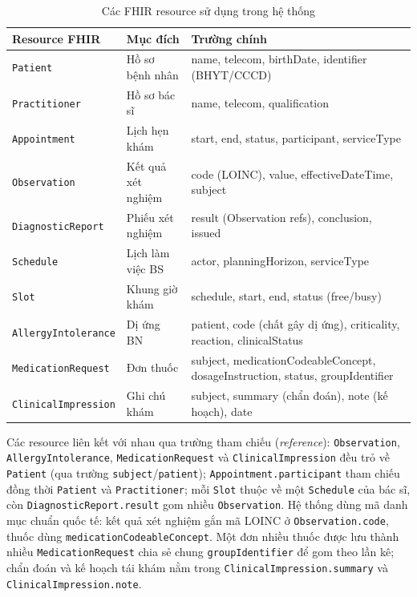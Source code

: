 \documentclass[a4paper,13pt,3p,twoside,openany]{report}
\theoremstyle{definition}
\theoremstyle{remark}
\theoremstyle{definition}
\begin{document}
\begin{table}[H]
\centering
\begin{tabular}{|l|l|p{7cm}|}
\hline
\textbf{Resource FHIR} & \textbf{Mục đích} & \textbf{Trường chính} \\
\hline
\texttt{Patient} & Hồ sơ bệnh nhân & name, telecom, birthDate, identifier (BHYT/CCCD) \\
\hline
\texttt{Practitioner} & Hồ sơ bác sĩ & name, telecom, qualification \\
\hline
\texttt{Appointment} & Lịch hẹn khám & start, end, status, participant, serviceType \\
\hline
\texttt{Observation} & Kết quả xét nghiệm & code (LOINC), value, effectiveDateTime, subject \\
\hline
\texttt{DiagnosticReport} & Phiếu xét nghiệm & result (Observation refs), conclusion, issued \\
\hline
\texttt{Schedule} & Lịch làm việc BS & actor, planningHorizon, serviceType \\
\hline
\texttt{Slot} & Khung giờ khám & schedule, start, end, status (free/busy) \\
\hline
\texttt{AllergyIntolerance} & Dị ứng BN & patient, code (chất gây dị ứng), criticality, reaction, clinicalStatus \\
\hline
\texttt{MedicationRequest} & Đơn thuốc & subject, medicationCodeableConcept, dosageInstruction, status, groupIdentifier \\
\hline
\texttt{ClinicalImpression} & Ghi chú khám & subject, summary (chẩn đoán), note (kế hoạch), date \\
\hline
\end{tabular}
\caption{Các FHIR resource sử dụng trong hệ thống}
\label{tab:fhir-resources}
\end{table}

Các resource liên kết với nhau qua trường tham chiếu (\textit{reference}): \texttt{Observation}, \texttt{AllergyIntolerance}, \texttt{MedicationRequest} và \texttt{ClinicalImpression} đều trỏ về \texttt{Patient} (qua trường \texttt{subject}/\texttt{patient}); \texttt{Appointment.participant} tham chiếu đồng thời \texttt{Patient} và \texttt{Practitioner}; mỗi \texttt{Slot} thuộc về một \texttt{Schedule} của bác sĩ, còn \texttt{DiagnosticReport.result} gom nhiều \texttt{Observation}. Hệ thống dùng mã danh mục chuẩn quốc tế: kết quả xét nghiệm gắn mã LOINC ở \texttt{Observation.code}, thuốc dùng \texttt{medicationCodeableConcept}. Một đơn nhiều thuốc được lưu thành nhiều \texttt{MedicationRequest} chia sẻ chung \texttt{groupIdentifier} để gom theo lần kê; chẩn đoán và kế hoạch tái khám nằm trong \texttt{ClinicalImpression.summary} và \texttt{ClinicalImpression.note}.
\end{document}
